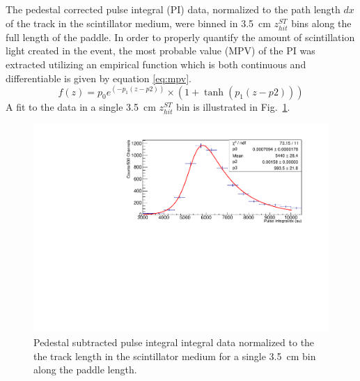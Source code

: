 The pedestal corrected pulse integral (PI) data, normalized to the path length $dx$ of the track in the scintillator medium, were binned in 3.5~cm $z^{ST}_{hit}$ bins along the full length of the paddle. In order to properly quantify the amount of scintillation light created in the event, the most probable value (MPV) of the PI was extracted utilizing an empirical function which is both continuous and differentiable is given by equation \ref{eq:mpv}.
	\begin{equation}\label{eq:mpv}
	f(z)  = p_0 e^{(-p_1(z - p2))} \times (1+ \tanh(p_1(z - p2))) 
	\end{equation}
A fit to the data in a single 3.5~cm $z^{ST}_{hit}$ bin is illustrated in Fig.~\ref{fig:mpv_fit}. 
	\begin{figure}[!htb]
	\centering
	\includegraphics[width=1.0\columnwidth]{calibration/figs/PiFit_sector15_int3}
	\caption{Pedestal subtracted pulse integral integral data normalized to the the track length in the scintillator medium for a single 3.5~cm bin along the paddle length.}
	\label{fig:mpv_fit}
	\end{figure}
